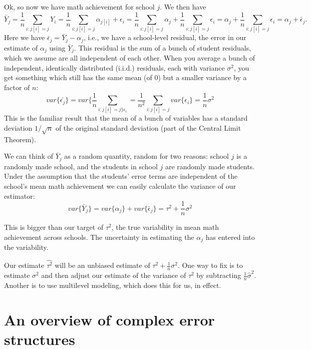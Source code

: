 \documentclass[
  letterpaper,
  DIV=11,
  numbers=noendperiod]{scrreprt}
\begin{document}
Ok, so now we have math achievement for school \(j\). We then have
\[\bar{Y}_j = \frac{1}{n} \sum_{i : j[i] = j} Y_i  = \frac{1}{n} \sum_{i : j[i] = j} \alpha_{j[i]} + \epsilon_i =   \frac{1}{n} \sum_{i : j[i] = j} \alpha_j +  \frac{1}{n} \sum_{i : j[i] = j} \epsilon_i = \alpha_j +  \frac{1}{n} \sum_{i : j[i] = j}\epsilon_i = \alpha_j + \bar{\epsilon}_j .\]
Here we have \(\bar{\epsilon}_j = \bar{Y}_j - \alpha_j\), i.e., we have
a school-level residual, the error in our estimate of \(\alpha_j\) using
\(\bar{Y}_j\). This residual is the sum of a bunch of student residuals,
which we assume are all independent of each other. When you average a
bunch of independent, identically distributed (i.i.d.) residuals, each
with variance \(\sigma^2\), you get something which still has the same
mean (of 0) but a smaller variance by a factor of \(n\):
\[var\{ \bar{\epsilon_j} \} = var\{  \frac{1}{n} \sum_{i : j[i] = j\}\epsilon_i } = \frac{1}{n^2} \sum_{i : j[i] = j} var\{ \epsilon_i \} =  \frac{1}{n} \sigma^2\]
This is the familiar result that the mean of a bunch of variables has a
standard deviation \(1/\sqrt{n}\) of the original standard deviation
(part of the Central Limit Theorem).

We can think of \(\bar{Y}_j\) as a random quantity, random for two
reasons: school \(j\) is a randomly made school, and the students in
school \(j\) are randomly made students. Under the assumption that the
students' error terms are independent of the school's mean math
achievement we can easily calculate the variance of our estimator:
\[var\{ \bar{Y}_j \} = var\{ \alpha_j \} + var\{ \bar{\epsilon}_j \} =   \tau^2 +  \frac{1}{n} \sigma^2\]

This is bigger than our target of \(\tau^2\), the true variability in
mean math achievement across schools. The uncertainty in estimating the
\(\alpha_j\) has entered into the variability.

Our estimate \(\widehat{\tau^2}\) will be an unbiased estimate of
\(\tau^2 + \frac{1}{n} \sigma^2\). One way to fix is to estimate
\(\sigma^2\) and then adjust our estimate of the variance of \(\tau^2\)
by subtracting \(\frac{1}{n} \hat{\sigma}^2\). Another is to use
multilevel modeling, which does this for us, in effect.

\hypertarget{an-overview-of-complex-error-structures}{%
\chapter{An overview of complex error
structures}\label{an-overview-of-complex-error-structures}}
\end{document}
